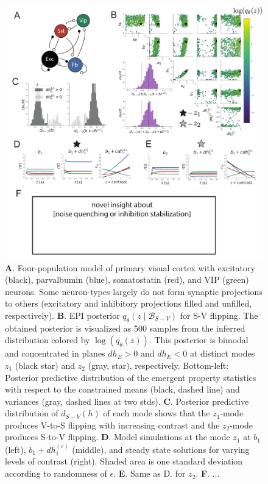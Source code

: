 \documentclass[11pt]{article}
\begin{document}
\clearpage
\begin{figure}[h]
\caption{\small \textbf{A}.  Four-population model of primary visual cortex with excitatory (black), parvalbumin (blue), somatostatin (red), and VIP (green) neurons.   Some neuron-types largely do not form synaptic projections to others  (excitatory and inhibitory projections filled and unfilled, respectively).
\textbf{B}. EPI posterior $q_\theta(z \mid \mathcal{B}_{S-V})$ for S-V flipping. The obtained posterior is visualized as 500 samples from the inferred distribution colored by $\log(q_\theta(z))$. This posterior is bimodal and concentrated in planes $dh_E > 0$ and $dh_E < 0$ at distinct modes $z_1$ (black star) and $z_2$ (gray, star), respectively.  Bottom-left: Posterior predictive distribution of the emergent property statistics with respect to the constrained means (black, dashed line) and variances (gray, dashed lines at two stds). 
\textbf{C}. Posterior predictive distribution of $d_{S-V}(h)$ of each mode shows that the $z_1$-mode produces V-to-S flipping with increasing contrast and the $z_2$-mode produces S-to-V flipping.
\textbf{D}. Model simulations at the mode $z_1$ at $b_1$ (left), $b_1 + dh_1^{(c)}$ (middle), and steady state solutions for varying levels of contrast (right).  Shaded area is one standard deviation according to randomness of $\epsilon$.  \textbf{E}. Same as D. for $z_2$. \textbf{F}. ...
 }\label{fig:SV_flip}
\begin{center}
\includegraphics[scale=.31]{figs/Fig3/Fig3.pdf}
\end{center}
\end{figure}
\clearpage
\end{document}
